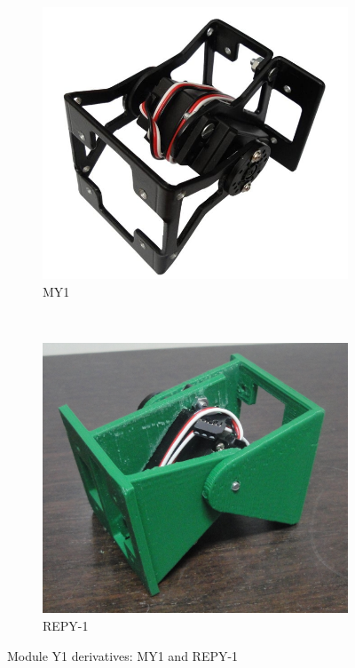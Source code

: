 \begin{figure}[h]
		\centering
        \begin{subfigure}[b]{0.3\textwidth}
                \centering
                \includegraphics[width=\textwidth]{images/Y1_MY1_01.jpg}
                \caption{MY1}
                \label{fig:hardware_my1}
        \end{subfigure}
        ~
        \begin{subfigure}[b]{0.3\textwidth}
                \centering
                \includegraphics[width=\textwidth]{images/Y1_REPY1_01.jpg}
                \caption{REPY-1}
                \label{fig:hardware_repy1}
        \end{subfigure}
        \caption{Module Y1 derivatives: MY1 and REPY-1} \label{fig:hardware_y1_derivatives}
\end{figure}

